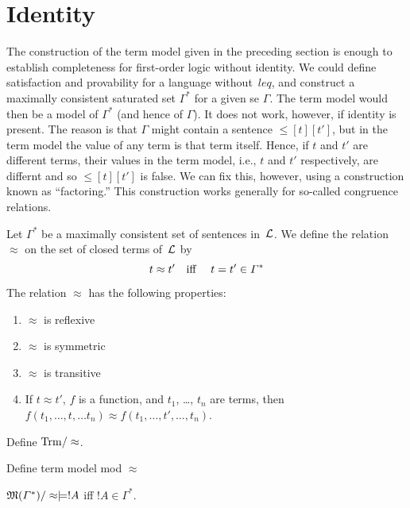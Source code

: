 \documentclass[open-logic-section]{subfiles}
\begin{document}
\section{Identity}

\begin{wordy}
The construction of the term model given in the preceding section is
enough to establish completeness for first-order logic without
identity.  We could define satisfaction and provability for a language
without~$leq$, and construct a maximally consistent saturated set
$\Gamma^*$ for a given se $\Gamma$.  The term model would then be a
model of $\Gamma^*$ (and hence of $\Gamma$).  It does not work,
however, if identity is present.  The reason is that $\Gamma$ might
contain a sentence $\leq[t][t']$, but in the term model the value of
any term is that term itself. Hence, if $t$ and $t'$ are different
terms, their values in the term model, i.e., $t$ and $t'$
respectively, are differnt and so $\leq[t][t']$ is false.  We can fix
this, however, using a construction known as ``factoring.''  This
construction works generally for so-called congruence relations.
\end{wordy}

\begin{defn}
Let $\Gamma^*$ be a maximally consistent set of sentences in~$\mathcal
L$. We define the relation $\approx$ on the set of closed terms
of~$\mathcal L$ by
\[
t \approx t' \text{\quad iff \quad} \leq[t][t'] \in \Gamma^*
\]
\end{defn}

\begin{prop}
The relation $\approx$ has the following properties:
\begin{enumerate}
\item $\approx$ is reflexive
\item $\approx$ is symmetric
\item  $\approx$ is transitive
\item If $t \approx t'$, $f$ is a function, and $t_1$, \dots, $t_n$ are
  terms, then $f(t_1,\dots, t, \dots t_n) \approx f(t_1, \dots, t',
  \dots, t_n)$.
\end{enumerate}
\end{prop}


\begin{defn}
Define $\Trm/\approx$.
\end{defn}

\begin{defn}
Define term model mod $\approx$
\end{defn}

\begin{prop}
$\Sat{M(\Gamma^*)/\approx}{!A}$ iff $!A \in \Gamma^*$.
\end{prop}
\end{document}
